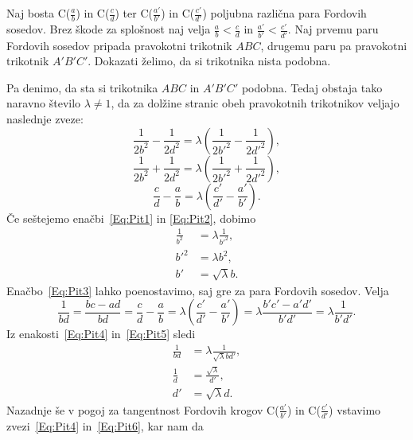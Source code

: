 \documentclass[mat1]{fmfdelo}
\begin{document}
\begin{dokaz}
%
Naj bosta C($\frac{a}{b}$) in C($\frac{c}{d}$) ter C($\frac{a'}{b'}$) in C($\frac{c'}{d'}$) poljubna različna para Fordovih sosedov. Brez škode za splošnost naj velja $\frac{a}{b}<\frac{c}{d}$ in $\frac{a'}{b'}<\frac{c'}{d'}$. Naj prvemu paru Fordovih sosedov pripada pravokotni trikotnik $ABC$, drugemu paru pa pravokotni trikotnik $A'B'C'$. Dokazati želimo, da si trikotnika nista podobna.

Pa denimo, da sta si trikotnika $ABC$ in $A'B'C'$ podobna. Tedaj obstaja tako naravno število $\lambda\ne{1}$, da za dolžine stranic obeh pravokotnih trikotnikov veljajo naslednje zveze:
%
\begin{equation}
\label{Eq:Pit1}
\frac{1}{2b^2}-\frac{1}{2d^2} = \lambda \left (\frac{1}{2b'^2}-\frac{1}{2d'^2} \right ),
\end{equation}
%
\begin{equation}
\label{Eq:Pit2}
\frac{1}{2b^2}+\frac{1}{2d^2} = \lambda \left (\frac{1}{2b'^2}+\frac{1}{2d'^2} \right ),
\end{equation}
%
\begin{equation}
\label{Eq:Pit3}
\frac{c}{d}-\frac{a}{b} = \lambda \left (\frac{c'}{d'}-\frac{a'}{b'} \right ).
\end{equation}
%
Če seštejemo enačbi~\eqref{Eq:Pit1} in \eqref{Eq:Pit2}, dobimo
%
\begin{align}
\label{Eq:Pit4}
\frac{1}{b^2} &= \lambda \frac{1}{b'^2}, \nonumber \\
b'^2 &= \lambda b^2, \nonumber \\
b' &= \sqrt\lambda b.
\end{align}
%
Enačbo~\eqref{Eq:Pit3} lahko poenostavimo, saj gre za para Fordovih sosedov. Velja
\begin{equation}
\label{Eq:Pit5}
\frac{1}{bd} = \frac{bc-ad}{bd} = \frac{c}{d}-\frac{a}{b} = \lambda \left (\frac{c'}{d'}-\frac{a'}{b'} \right ) = \lambda \frac{b'c'-a'd'}{b'd'} = \lambda \frac{1}{b'd'}.
\end{equation}
%
Iz enakosti~\eqref{Eq:Pit4} in~\eqref{Eq:Pit5} sledi 
%
\begin{align}
\label{Eq:Pit6}
\frac{1}{bd} &=\lambda \frac{1}{\sqrt\lambda bd'}, \nonumber \\
\frac{1}{d} &= \frac{\sqrt\lambda}{d'}, \nonumber \\
d' &= \sqrt\lambda d.
\end{align}
%
Nazadnje še v pogoj za tangentnost Fordovih krogov C($\frac{a'}{b'}$) in C($\frac{c'}{d'}$) vstavimo zvezi~\eqref{Eq:Pit4} in~\eqref{Eq:Pit6}, kar nam da

\end{dokaz}
\end{document}
